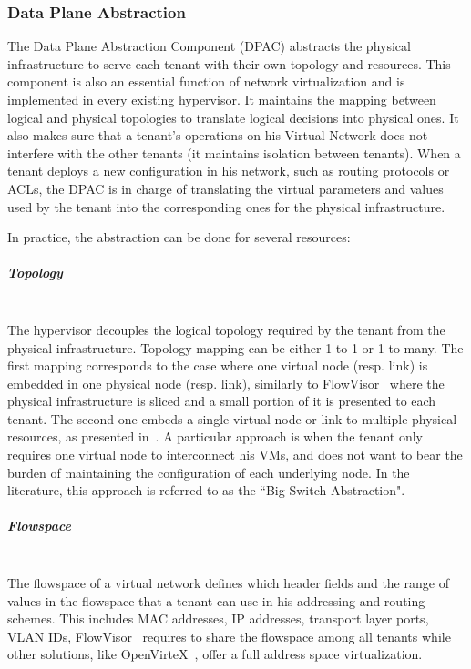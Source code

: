 \subsubsection{Data Plane Abstraction}
\label{sec:abstraction_comp}
The Data Plane Abstraction Component (DPAC) abstracts the physical infrastructure to serve each tenant with their own topology and resources.
This component is also an essential function of network virtualization and is implemented in every existing hypervisor.
It maintains the mapping between logical and physical topologies to translate logical decisions into physical ones.
It also makes sure that a tenant's operations on his Virtual Network does not interfere with the other tenants (\ie it maintains isolation between tenants). When a tenant deploys a new configuration in his network, such as routing protocols or ACLs, the DPAC is in charge of translating the virtual parameters and values used by the tenant into the corresponding ones for the physical infrastructure.

In practice, the abstraction can be done for several resources:

\subparagraph{\textbf{Topology}}\textbf{}\\
The hypervisor decouples the logical topology required by the tenant from the physical infrastructure.
Topology mapping can be either 1-to-1 or 1-to-many. 
The first mapping corresponds to the case where one virtual node (resp. link) is embedded in one physical node (resp. link), similarly to FlowVisor~\cite{FlowVisor-Sherwood2009} where the physical infrastructure is sliced and a small portion of it is presented to each tenant.
The second one embeds a single virtual node or link to multiple physical resources, as presented in~\cite{OpenVirteX-Al-Shabibi2014,VeRTIGO-Corin2012a}.
A particular approach is when the tenant only requires one virtual node to interconnect his VMs, and does not want to bear the burden of maintaining the configuration of each underlying node. In the literature, this approach is referred to as the ``Big Switch Abstraction".


\subparagraph{\textbf{Flowspace}}\textbf{}\\
The flowspace of a virtual network defines which header fields and the range of values in the flowspace that a tenant can use in his addressing and routing schemes. This includes MAC addresses, IP addresses, transport layer ports, VLAN IDs, \etc
FlowVisor~\cite{FlowVisor-Sherwood2009} requires to share the flowspace among all tenants while other solutions, like OpenVirteX~\cite{OpenVirteX-Al-Shabibi2014}, offer a full address space virtualization.

